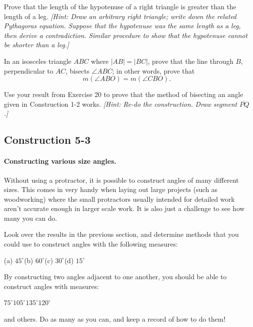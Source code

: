 \documentclass[12pt]{book} %
\begin{document}
\begin{ExerciseList}
\Exercise Prove that the length of the hypotenuse of a right triangle is greater than the length of a leg. \textit{[Hint: Draw an arbitrary right triangle; write down the related Pythagoras equation. Suppose that the hypotenuse was the same length as a leg, then derive a contradiction. Similar procedure to show that the hypotenuse cannot be shorter than a leg.]}

\Exercise In an isosceles triangle $ABC$ where $|AB|=|BC|$, prove that the line through $B$, perpendicular to $AC$, bisects $\angle ABC$; in other words, prove that
\[
m(\angle ABO)=m(\angle CBO).
\]


\Exercise Use your result from Exercise 20 to prove that the method of bisecting an angle given in Construction 1-2 works. \textit{[Hint: Re-do the construction. Draw segment $\overline{PQ}$.]}
\end{ExerciseList}

\subsection*{Construction 5-3}

\paragraph{Constructing various size angles.}

Without using a protractor, it is possible to construct angles of many different sizes. This comes in very handy when laying out large projects (such as woodworking) where the small protractors usually intended for detailed work aren't accurate enough in larger scale work. It is also just a challenge to see how many you can do.

Look over the results in the previous section, and determine methods that you could use to construct angles with the following measures:
\begin{center}
(a) $45^\circ$\qquad (b) $60^\circ$\qquad (c) $30^\circ$\qquad (d) $15^\circ$
\end{center}

By constructing two angles adjacent to one another, you should be able to construct angles with measures:
\begin{center}
$75^\circ$\qquad $105^\circ$\qquad $135^\circ$\qquad $120^\circ$
\end{center}

and others. Do as many as you can, and keep a record of how to do them!
\end{document}
